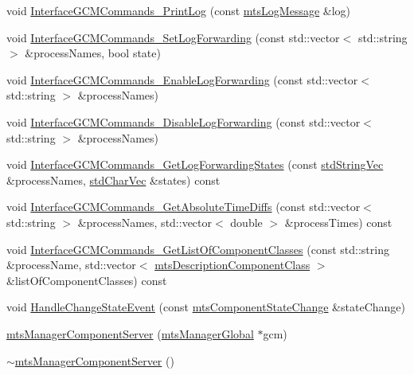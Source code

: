\begin{DoxyCompactItemize}
\item 
void \hyperlink{classmts_manager_component_server_ab839a8bfcec131ad95a3211c81189913}{Interface\-G\-C\-M\-Commands\-\_\-\-Print\-Log} (const \hyperlink{classmts_log_message}{mts\-Log\-Message} \&log)
\item 
void \hyperlink{classmts_manager_component_server_ae577ba00e3227d38951469ee52a94bb9}{Interface\-G\-C\-M\-Commands\-\_\-\-Set\-Log\-Forwarding} (const std\-::vector$<$ std\-::string $>$ \&process\-Names, bool state)
\item 
void \hyperlink{classmts_manager_component_server_a1019aae9f1b57584d6bd6aebaf04f46b}{Interface\-G\-C\-M\-Commands\-\_\-\-Enable\-Log\-Forwarding} (const std\-::vector$<$ std\-::string $>$ \&process\-Names)
\item 
void \hyperlink{classmts_manager_component_server_a1bef6d6b8723f33d15a78f98e3f3fad9}{Interface\-G\-C\-M\-Commands\-\_\-\-Disable\-Log\-Forwarding} (const std\-::vector$<$ std\-::string $>$ \&process\-Names)
\item 
void \hyperlink{classmts_manager_component_server_a27c2f1fbf13c43eb3baad98eed4ad610}{Interface\-G\-C\-M\-Commands\-\_\-\-Get\-Log\-Forwarding\-States} (const \hyperlink{mts_generic_object_proxy_8h_ae2238149254430b4959aa4e16892fc07}{std\-String\-Vec} \&process\-Names, \hyperlink{mts_generic_object_proxy_8h_a3fcb43cabc338a5aee6772138bee2416}{std\-Char\-Vec} \&states) const 
\item 
void \hyperlink{classmts_manager_component_server_aac8ecf77336d288fb014924dd8637e47}{Interface\-G\-C\-M\-Commands\-\_\-\-Get\-Absolute\-Time\-Diffs} (const std\-::vector$<$ std\-::string $>$ \&process\-Names, std\-::vector$<$ double $>$ \&process\-Times) const 
\item 
void \hyperlink{classmts_manager_component_server_ac4192696d711afd1a13ae5097b4f2148}{Interface\-G\-C\-M\-Commands\-\_\-\-Get\-List\-Of\-Component\-Classes} (const std\-::string \&process\-Name, std\-::vector$<$ \hyperlink{classmts_description_component_class}{mts\-Description\-Component\-Class} $>$ \&list\-Of\-Component\-Classes) const 
\item 
void \hyperlink{classmts_manager_component_server_ae94bfdf1bd661f6e9ae08f60ab064e6f}{Handle\-Change\-State\-Event} (const \hyperlink{classmts_component_state_change}{mts\-Component\-State\-Change} \&state\-Change)
\item 
\hyperlink{classmts_manager_component_server_a76de83e83abbedecc53b7bcbe296d849}{mts\-Manager\-Component\-Server} (\hyperlink{classmts_manager_global}{mts\-Manager\-Global} $\ast$gcm)
\item 
\hyperlink{classmts_manager_component_server_af4ffa495025cd7f60b992f29edb71543}{$\sim$mts\-Manager\-Component\-Server} ()
\end{DoxyCompactItemize}
